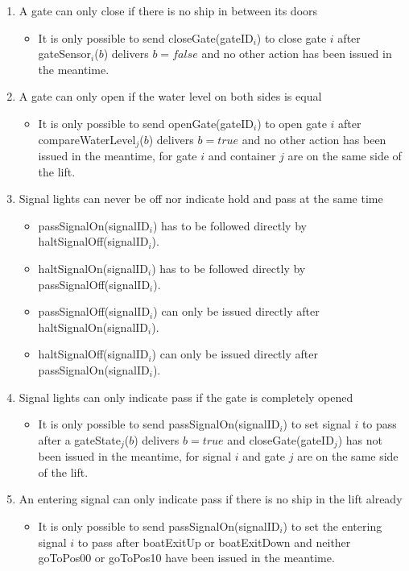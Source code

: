 \begin{enumerate}
	\item A gate can only close if there is no ship in between its doors
	\begin{itemize}
		\item It is only possible to send closeGate(gateID$_i$) to close gate $i$ after gateSensor$_i$($b$) delivers $b = false$ and no other action has been issued in the meantime.
	\end{itemize}
	
	\item A gate can only open if the water level on both sides is equal
	\begin{itemize}
		\item It is only possible to send openGate(gateID$_i$) to open gate $i$ after \linebreak compareWaterLevel$_j$($b$) delivers $b = true$ and no other action has been issued in the meantime, for gate $i$ and container $j$ are on the same side of the lift.
	\end{itemize}
	
	\item Signal lights can never be off nor indicate hold and pass at the same time
		\begin{itemize}
			\item passSignalOn(signalID$_i$) has to be followed directly by \\ haltSignalOff(signalID$_i$).
			\item haltSignalOn(signalID$_i$) has to be followed directly by \\passSignalOff(signalID$_i$).
			\item passSignalOff(signalID$_i$) can only be issued directly after \\haltSignalOn(signalID$_i$).
			\item haltSignalOff(signalID$_i$) can only be issued directly after \\ passSignalOn(signalID$_i$).
		\end{itemize}
	\item Signal lights can only indicate pass if the gate is completely opened
		\begin{itemize}
			\item It is only possible to send passSignalOn(signalID$_i$) to set signal $i$ to pass after a gateState$_j$($ b $) delivers $b = true$ and closeGate(gateID$_j$) has not been issued in the meantime, for signal $i$ and gate $j$ are on the same side of the lift.
		\end{itemize}
	\item An entering signal can only indicate pass if there is no ship in the lift already
		\begin{itemize}
			\item It is only possible to send passSignalOn(signalID$_i$) to set the entering signal $i$ to pass after boatExitUp or boatExitDown and neither goToPos00 or goToPos10 have been issued in the meantime.\vspace{0.3cm}
		\end{itemize}
\end{enumerate}


